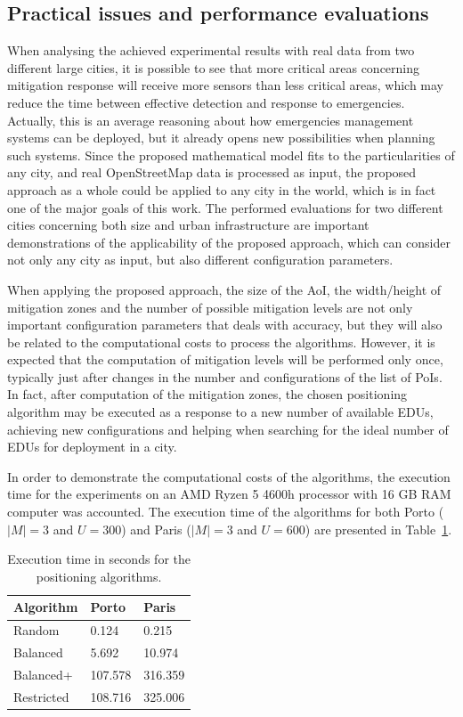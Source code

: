 \begin{refsection}
\subsection{Practical issues and performance evaluations}

When analysing the achieved experimental results with real data from two different large cities, it is possible to see that more critical areas concerning mitigation response will receive more sensors than less critical areas, which may reduce the time between effective detection and response to emergencies. Actually, this is an average reasoning about how emergencies management systems can be deployed, but it already opens new possibilities when planning such systems. Since the proposed mathematical model fits to the particularities of any city, and real OpenStreetMap data is processed as input, the proposed approach as a whole could be applied to any city in the world, which is in fact one of the major goals of this work. The performed evaluations for two different cities concerning both size and urban infrastructure are important demonstrations of the applicability of the proposed approach, which can consider not only any city as input, but also different configuration parameters.

When applying the proposed approach, the size of the AoI, the width/height of mitigation zones and the number of possible mitigation levels are not only important configuration parameters that deals with accuracy, but they will also be related to the computational costs to process the algorithms. However, it is expected that the computation of mitigation levels will be performed only once, typically just after changes in the number and configurations of the list of PoIs. In fact, after computation of the mitigation zones, the chosen positioning algorithm may be executed as a response to a new number of available EDUs, achieving new configurations and helping when searching for the ideal number of EDUs for deployment in a city. 

In order to demonstrate the computational costs of the algorithms, the execution time for the experiments on an AMD Ryzen 5 4600h processor with 16 GB RAM computer was accounted. The execution time of the algorithms for both Porto ($|M|=3$ and $U=300$) and Paris ($|M|=3$ and $U=600$) are presented in Table~\ref{Table:costs}.

\begin{table}
  \centering
  \caption{Execution time in seconds for the positioning algorithms.}\label{Table:costs}
  \begin{tabular}{lll}
    \hline
    \textbf{Algorithm} & \textbf{Porto} & \textbf{Paris} \\
    \hline
    Random  &  0.124 &  0.215 \\ 
    Balanced  & 5.692  &  10.974 \\ 
    Balanced+  & 107.578 &  316.359  \\ 
    Restricted  & 108.716  & 325.006 \\
    \hline
  \end{tabular}
\end{table}


\end{refsection}
